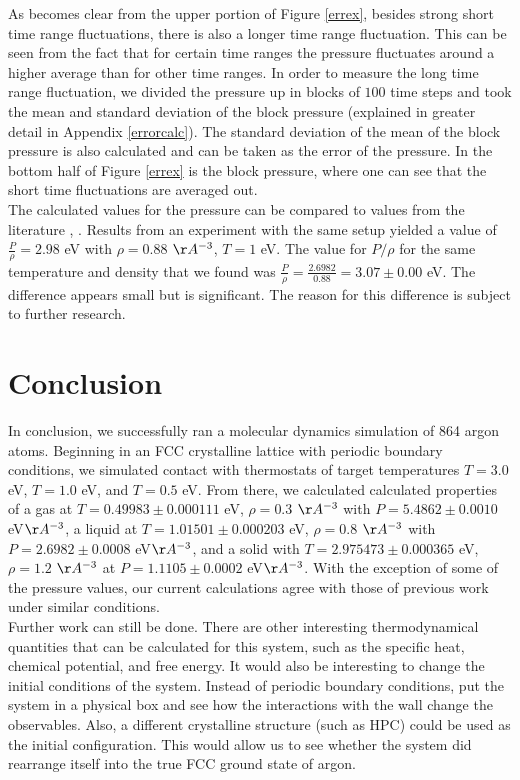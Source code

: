 \documentclass{article}
\begin{document}
\begin{multicols}{2}
As becomes clear from the upper portion of Figure \ref{errex}, besides strong short time range fluctuations, there is also a longer time range fluctuation.  This can be seen from the fact that for certain time ranges the pressure fluctuates around a higher average than for other time ranges.  In order to measure the long time range fluctuation, we divided the pressure up in blocks of $100$ time steps and took the mean and standard deviation of the block pressure (explained in greater detail in Appendix \ref{errorcalc}).  The standard deviation of the mean of the block pressure is also calculated and can be taken as the error of the pressure.  In the bottom half of Figure \ref{errex} is the block pressure, where one can see that the short time fluctuations are averaged out.\\

The calculated values for the pressure can be compared to values from the literature \cite{thijssen}, \cite{verlet}. Results from an experiment with the same setup yielded a value of $\frac{P}{\rho} = 2.98$ eV with $\rho = 0.88$ $\AA ^{-3}$, $T = 1$ eV. The value for $P/\rho$ for the same temperature and density that we found was $\frac{P}{\rho} = \frac{2.6982}{0.88} = 3.07 \pm 0.00 $ eV.  The difference appears small but is significant. The reason for this difference is subject to further research.

\section{Conclusion}
\label{conc}

In conclusion, we successfully ran a molecular dynamics simulation of 864 argon atoms.  Beginning in an FCC crystalline lattice with periodic boundary conditions, we simulated contact with thermostats of target temperatures $T=3.0$ eV, $T=1.0$ eV, and $T=0.5$ eV.  From there, we calculated calculated properties of a gas at $T=0.49983 \pm 0.000111$ eV, $\rho=0.3$ $\AA ^{-3}$ with $P=5.4862 \pm 0.0010 $ eV$\AA^{-3}$, a liquid at $T= 1.01501 \pm 0.000203$ eV, $\rho =0.8$ $\AA ^{-3}$ with $P=2.6982 \pm 0.0008$ eV$\AA^{-3}$, and a solid with $T=2.975473 \pm 0.000365$  eV, $\rho=1.2$ $\AA ^{-3}$ at $P=1.1105 \pm 0.0002 $ eV$\AA^{-3}$.  With the exception of some of the pressure values, our current calculations agree with those of previous work under similar conditions.  \\

Further work can still be done.  There are other interesting thermodynamical quantities that can be calculated for this system, such as the specific heat, chemical potential, and free energy.  It would also be interesting to change the initial conditions of the system.  Instead of periodic boundary conditions, put the system in a physical box and see how the interactions with the wall change the observables.  Also, a different crystalline structure (such as HPC) could be used as the initial configuration.  This would allow us to see whether the system did rearrange itself into the true FCC ground state of argon. 


\end{multicols}
\end{document}
